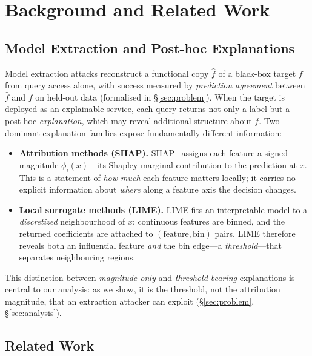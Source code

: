 \documentclass[sigconf,anonymous,review]{acmart}
\begin{document}
\section{Background and Related Work}
\label{sec:background}

\subsection{Model Extraction and Post-hoc Explanations}
\label{subsec:prelim}

Model extraction attacks reconstruct a functional copy $\hat{f}$ of a black-box
target $f$ from query access alone, with success measured by \emph{prediction
agreement} between $\hat{f}$ and $f$ on held-out data (formalised in
\S\ref{sec:problem}). When the target is deployed as an explainable service, each
query returns not only a label but a post-hoc \emph{explanation}, which may reveal
additional structure about $f$. Two dominant explanation families expose
fundamentally different information:

\begin{itemize}
  \item \textbf{Attribution methods (SHAP).} SHAP~\cite{lundberg2017shap} assigns
  each feature a signed magnitude $\phi_i(x)$---its Shapley marginal contribution
  to the prediction at $x$. This is a statement of \emph{how much} each feature
  matters locally; it carries no explicit information about \emph{where} along a
  feature axis the decision changes.
  \item \textbf{Local surrogate methods (LIME).} LIME fits an interpretable model
  to a \emph{discretized} neighbourhood of $x$: continuous features are binned, and
  the returned coefficients are attached to $(\text{feature}, \text{bin})$ pairs.
  LIME therefore reveals both an influential feature \emph{and} the bin edge---a
  \emph{threshold}---that separates neighbouring regions.
\end{itemize}

This distinction between \emph{magnitude-only} and \emph{threshold-bearing}
explanations is central to our analysis: as we show, it is the threshold, not the
attribution magnitude, that an extraction attacker can exploit
(\S\ref{sec:problem}, \S\ref{sec:analysis}).

\subsection{Related Work}
\label{subsec:related}
\end{document}
